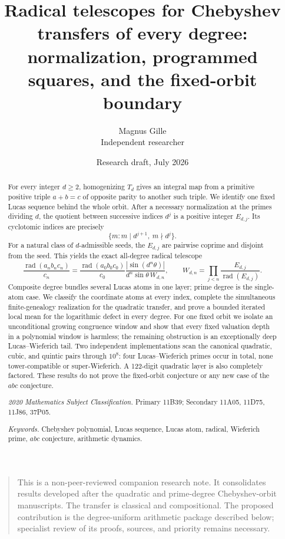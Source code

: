 \documentclass[11pt]{article}
\title{Radical telescopes for Chebyshev transfers of every degree:\\
normalization, programmed squares, and the fixed-orbit boundary}
\author{Magnus Gille\\Independent researcher}
\date{Research draft, July 2026}
\theoremstyle{definition}
\theoremstyle{remark}
\newcommand{\rad}{\operatorname{rad}}
\begin{document}
\maketitle

\begin{quote}\small
This is a non-peer-reviewed companion research note.  It consolidates
results developed after the quadratic and prime-degree Chebyshev-orbit
manuscripts.  The transfer is classical and compositional.  The proposed
contribution is the degree-uniform arithmetic package described below;
specialist review of its proofs, sources, and priority remains necessary.
\end{quote}

\begin{abstract}
For every integer $d\ge2$, homogenizing $T_d$ gives an integral map
from a primitive positive triple $a+b=c$ of opposite parity to another
such triple.  We identify one fixed Lucas sequence behind the whole orbit.
After a necessary normalization at the primes dividing $d$, the quotient
between successive indices $d^j$ is a positive integer $E_{d,j}$.  Its
cyclotomic indices are precisely
\[
 \{m:m\mid d^{j+1},\ m\nmid d^j\}.
\]
For a natural class of $d$-admissible seeds, the $E_{d,j}$ are
pairwise coprime and disjoint from the seed.  This yields the exact
all-degree radical telescope
\[
 \frac{\rad(a_nb_nc_n)}{c_n}
 =\frac{\rad(a_0b_0c_0)}{c_0}
   \frac{|\sin(d^n\theta)|}
        {d^n\sin\theta\,W_{d,n}},
 \qquad
 W_{d,n}=\prod_{j<n}\frac{E_{d,j}}{\rad(E_{d,j})}.
\]
Composite degree bundles several Lucas atoms in one layer; prime degree is
the single-atom case.  We classify the coordinate atoms at every index,
complete the simultaneous finite-genealogy realization for the quadratic
transfer, and prove a bounded iterated local mean for the logarithmic defect
in every degree.
For one fixed orbit we isolate an unconditional growing congruence window
and show that every fixed valuation depth in a polynomial window is
harmless; the remaining obstruction is an exceptionally deep
Lucas--Wieferich tail.  Two independent implementations scan the canonical
quadratic, cubic, and quintic pairs through \(10^8\): four
Lucas--Wieferich primes occur in total, none tower-compatible or
super-Wieferich.  A 122-digit quadratic layer is also completely factored.
These results do not prove the fixed-orbit conjecture or any new case of
the \(abc\) conjecture.

\medskip
\noindent\textit{2020 Mathematics Subject Classification.}
Primary 11B39; Secondary 11A05, 11D75, 11J86, 37P05.

\noindent\textit{Keywords.}
Chebyshev polynomial, Lucas sequence, Lucas atom, radical,
Wieferich prime, $abc$ conjecture, arithmetic dynamics.
\end{abstract}
\end{document}
